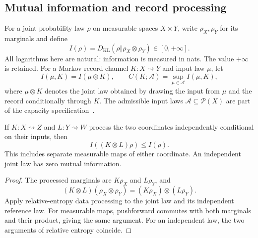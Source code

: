 \subsection{Mutual information and record processing}
\label{sec:record-information}

For a joint probability law $\rho$ on measurable spaces $X\times Y$,
write $\rho_X,\rho_Y$ for its marginals and define
\[
 I(\rho)=D_{\mathrm{KL}}(\rho\Vert\rho_X\otimes\rho_Y)
 \in[0,+\infty].
\]
All logarithms here are natural: information is measured in nats.
The value $+\infty$ is retained. For a Markov record channel
$K:X\rightsquigarrow Y$ and input law $\mu$, let
\[
 I(\mu,K)=I(\mu\otimes K),\qquad
 C(K;\mathcal A)=\sup_{\mu\in\mathcal A}I(\mu,K),
\]
where $\mu\otimes K$ denotes the joint law obtained by drawing the
input from $\mu$ and the record conditionally through $K$.
The admissible input laws $\mathcal A\subseteq\mathcal P(X)$ are
part of the capacity specification~\cite{gallager1968information}.

\begin{theorem}
\label{thm:information-contraction}
If $K:X\rightsquigarrow Z$ and $L:Y\rightsquigarrow W$ process
the two coordinates independently conditional on their inputs, then
\[
 I((K\otimes L)\rho)\le I(\rho).
\]
This includes separate measurable maps of either coordinate.
An independent joint law has zero mutual information.
\end{theorem}
\begin{proof}
The processed marginals are $K\rho_X$ and $L\rho_Y$, and
\[
 (K\otimes L)(\rho_X\otimes\rho_Y)
   =(K\rho_X)\otimes(L\rho_Y).
\]
Apply relative-entropy data processing to the joint law and its
independent reference law. For measurable maps, pushforward commutes
with both marginals and their product, giving the same argument.
For an independent law, the two arguments of relative entropy coincide.
\end{proof}

